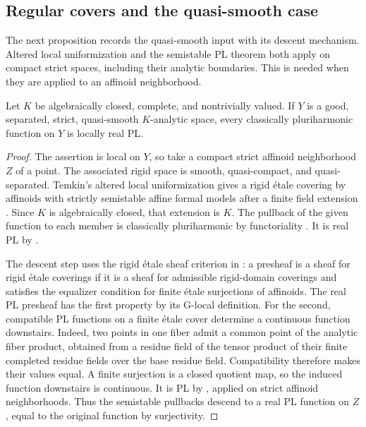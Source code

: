 \subsection{Regular covers and the quasi-smooth case}\label{sec:supplied-p061-regular-covers}

The next proposition records the quasi-smooth input with its descent mechanism. Altered local uniformization and the semistable PL theorem both apply on compact strict spaces, including their analytic boundaries. This is needed when they are applied to an affinoid neighborhood.

\begin{proposition}\label{prop:supplied-p061-quasismooth-input}
Let $K$ be algebraically closed, complete, and nontrivially valued. If $Y$ is a good, separated, strict, quasi-smooth $K$-analytic space, every classically pluriharmonic function on $Y$ is locally real PL.
\end{proposition}

\begin{proof}
The assertion is local on $Y$, so take a compact strict affinoid neighborhood $Z$ of a point. The associated rigid space is smooth, quasi-compact, and quasi-separated. Temkin's altered local uniformization gives a rigid \'{e}tale covering by affinoids with strictly semistable affine formal models after a finite field extension \cite[Corollary~3.3.2]{Temkin17}. Since $K$ is algebraically closed, that extension is $K$. The pullback of the given function to each member is classically pluriharmonic by functoriality \cite[Proposition~7.2(7)]{GR25Classical}. It is real PL by \cite[Proposition~7.8]{GR25Classical}.

The descent step uses the rigid \'{e}tale sheaf criterion in \cite[Proposition~3.2.2]{dJvdP96}: a presheaf is a sheaf for rigid \'{e}tale coverings if it is a sheaf for admissible rigid-domain coverings and satisfies the equalizer condition for finite \'{e}tale surjections of affinoids. The real PL presheaf has the first property by its G-local definition. For the second, compatible PL functions on a finite \'{e}tale cover determine a continuous function downstairs. Indeed, two points in one fiber admit a common point of the analytic fiber product, obtained from a residue field of the tensor product of their finite completed residue fields over the base residue field. Compatibility therefore makes their values equal. A finite surjection is a closed quotient map, so the induced function downstairs is continuous. It is PL by , applied on strict affinoid neighborhoods. Thus the semistable pullbacks descend to a real PL function on $Z$, equal to the original function by surjectivity.
\end{proof}

